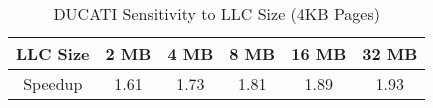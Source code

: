 \begin {table}[h]
\begin{center} 
\caption{\small DUCATI Sensitivity to LLC Size (4KB Pages) }
\begin{tabular}{| c | c | c | c | c | c | }
\hline
 LLC Size   & 2 MB  & 4 MB  & 8 MB  & 16 MB & 32 MB \\ \hline
 Speedup    & 1.61 & 1.73 & 1.81 & 1.89 & 1.93 \\ \hline

\end{tabular}
\label{table:LLC_sens}
\vspace{-0.3in}
\end{center}
\end{table}
